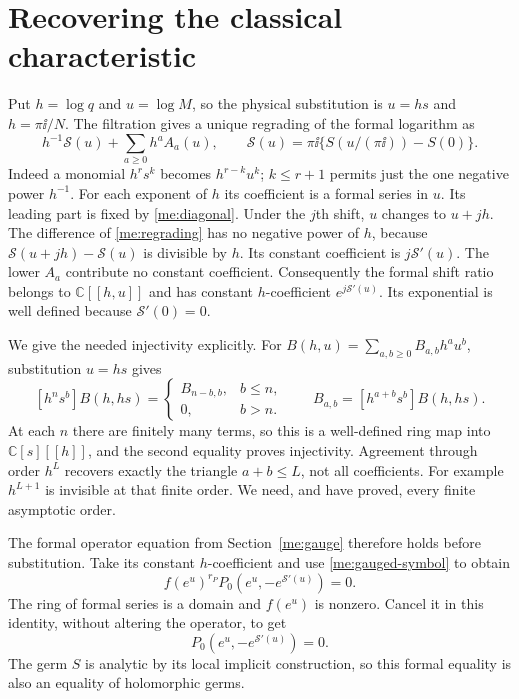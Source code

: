 \section{Recovering the classical characteristic}\label{me:formal}
Put $h=\log q$ and $u=\log M$, so the physical substitution is
$u=hs$ and $h=\pi\ii/N$. The filtration gives a unique regrading
of the formal logarithm as
\begin{equation}\label{me:regrading}
             h^{-1}\mathcal S(u)+\sum_{a\ge0}h^a A_a(u),
 \qquad\mathcal S(u)=\pi\ii\{S(u/(\pi\ii))-S(0)\}.
\end{equation}
Indeed a monomial $h^r s^k$ becomes $h^{r-k}u^k$;
$k\le r+1$ permits just the one negative power $h^{-1}$.
For each exponent of $h$ its coefficient is a formal series in
$u$. Its leading part is fixed by \eqref{me:diagonal}.
Under the $j$th shift, $u$ changes to $u+jh$. The difference of
\eqref{me:regrading} has no negative power of $h$, because
$\mathcal S(u+jh)-\mathcal S(u)$ is divisible by $h$. Its
constant coefficient is $j\mathcal S'(u)$. The lower $A_a$
contribute no constant coefficient. Consequently the formal
shift ratio belongs to $\mathbb C[[h,u]]$ and has constant
$h$-coefficient $e^{j\mathcal S'(u)}$. Its exponential is
well defined because $\mathcal S'(0)=0$.

We give the needed injectivity explicitly. For
$B(h,u)=\sum_{a,b\ge0}B_{a,b}h^au^b$, substitution $u=hs$ gives
\begin{equation}\label{me:coefficient-recovery}
 [h^ns^b]B(h,hs)=
 \begin{cases}B_{n-b,b},&b\le n,\\0,&b>n.\end{cases}
 \qquad B_{a,b}=[h^{a+b}s^b]B(h,hs).
\end{equation}
At each $n$ there are finitely many terms, so this is a well-defined
ring map into $\mathbb C[s][[h]]$, and the second equality proves
injectivity. Agreement through order $h^L$ recovers exactly the
triangle $a+b\le L$, not all coefficients. For example $h^{L+1}$
is invisible at that finite order. We need, and have proved, every
finite asymptotic order.

The formal operator equation from Section~\ref{me:gauge} therefore
holds before substitution. Take its constant $h$-coefficient and
use \eqref{me:gauged-symbol} to obtain
\[
 f(e^u)^{r_P}P_0(e^u,-e^{\mathcal S'(u)})=0.
\]
The ring of formal series is a domain and $f(e^u)$ is nonzero.
Cancel it in this identity, without altering the operator, to get
\begin{equation}\label{me:symbol-identity}
                  P_0(e^u,-e^{\mathcal S'(u)})=0.
\end{equation}
The germ $S$ is analytic by its local implicit construction, so
this formal equality is also an equality of holomorphic germs.

